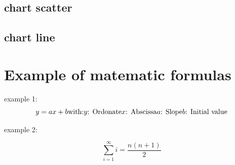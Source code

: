 \documentclass[reprint, floatfix, groupaddress, prb]{article}
\begin{document}
        
    \begin{figure}
        \begin{center}\end{center}
        \caption{}
        \label{}
    \end{figure}
    
    
    \hypertarget{chart-scatter}{%
\subsection{chart scatter}\label{chart-scatter}}

        
    \begin{figure}
        \begin{center}\end{center}
        \caption{}
        \label{}
    \end{figure}
    
    
    \hypertarget{chart-line}{%
\subsection{chart line}\label{chart-line}}

        
    \begin{figure}
        \begin{center}\end{center}
        \caption{}
        \label{}
    \end{figure}
    
    
    \hypertarget{example-of-matematic-formulas}{%
\section{Example of matematic
formulas}\label{example-of-matematic-formulas}}

    example 1: \[
y = a x + b\\
\text{with:}\\
y \text{: Ordonate}\\
x \text{: Abscissa}\\
a \text{: Slope}\\
b \text{: Initial value}
\]

    example 2:

\[\sum_{i=1}^{\infty} i = \frac{n(n+1)}{2}\]
\end{document}
